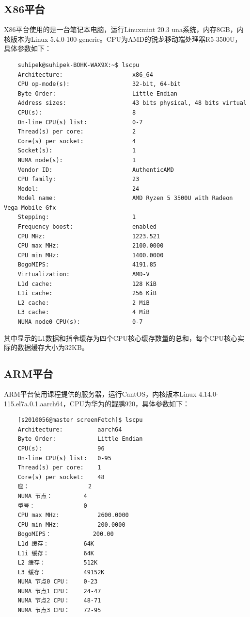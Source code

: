 \documentclass[a4paper]{article}
\begin{document}
\subsection{X86平台}
X86平台使用的是一台笔记本电脑，运行Linuxmint 20.3 una系统，内存8GB，内核版本为Linux 5.4.0-100-generic。CPU为AMD的锐龙移动端处理器R5-3500U，具体参数如下：
\begin{verbatim}
    suhipek@suhipek-BOHK-WAX9X:~$ lscpu
    Architecture:                    x86_64
    CPU op-mode(s):                  32-bit, 64-bit
    Byte Order:                      Little Endian
    Address sizes:                   43 bits physical, 48 bits virtual
    CPU(s):                          8
    On-line CPU(s) list:             0-7
    Thread(s) per core:              2
    Core(s) per socket:              4
    Socket(s):                       1
    NUMA node(s):                    1
    Vendor ID:                       AuthenticAMD
    CPU family:                      23
    Model:                           24
    Model name:                      AMD Ryzen 5 3500U with Radeon Vega Mobile Gfx
    Stepping:                        1
    Frequency boost:                 enabled
    CPU MHz:                         1223.521
    CPU max MHz:                     2100.0000
    CPU min MHz:                     1400.0000
    BogoMIPS:                        4191.85
    Virtualization:                  AMD-V
    L1d cache:                       128 KiB
    L1i cache:                       256 KiB
    L2 cache:                        2 MiB
    L3 cache:                        4 MiB
    NUMA node0 CPU(s):               0-7
\end{verbatim}
其中显示的L1数据和指令缓存为四个CPU核心缓存数量的总和，每个CPU核心实际的数据缓存大小为32KB。

\subsection{ARM平台}
ARM平台使用课程提供的服务器，运行CantOS，内核版本Linux 4.14.0-115.el7a.0.1.aarch64，CPU为华为的鲲鹏920，具体参数如下：
\begin{verbatim}
    [s2010056@master screenFetch]$ lscpu
    Architecture:          aarch64
    Byte Order:            Little Endian
    CPU(s):                96
    On-line CPU(s) list:   0-95
    Thread(s) per core:    1
    Core(s) per socket:    48
    座：                 2
    NUMA 节点：         4
    型号：              0
    CPU max MHz:           2600.0000
    CPU min MHz:           200.0000
    BogoMIPS：            200.00
    L1d 缓存：          64K
    L1i 缓存：          64K
    L2 缓存：           512K
    L3 缓存：           49152K
    NUMA 节点0 CPU：    0-23
    NUMA 节点1 CPU：    24-47
    NUMA 节点2 CPU：    48-71
    NUMA 节点3 CPU：    72-95
\end{verbatim}
\end{document}
